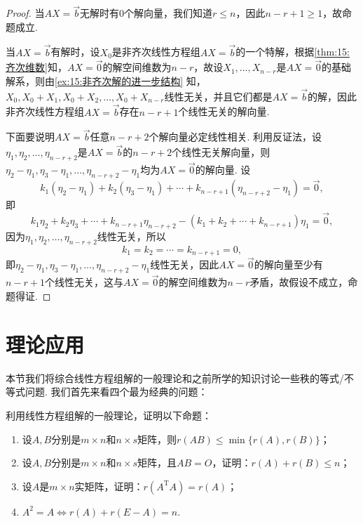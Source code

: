 \begin{proof}
    当$AX=\vec{b}$无解时有0个解向量，我们知道$r\leqslant n$，因此$n-r+1\geqslant 1$，故命题成立.

    当$AX=\vec{b}$有解时，设$X_0$是非齐次线性方程组$AX=\vec{b}$的一个特解，根据\autoref{thm:15:齐次维数}知，$AX=\vec{0}$的解空间维数为$n-r$，故设$X_1,\ldots,X_{n-r}$是$AX=\vec{0}$的基础解系，则由\autoref{ex:15:非齐次解的进一步结构} 知，$X_0,X_0+X_1,X_0+X_2,\ldots,X_0+X_{n-r}$线性无关，并且它们都是$AX=\vec{b}$的解，因此非齐次线性方程组$AX=\vec{b}$存在$n-r+1$个线性无关的解向量.

    下面要说明$AX=\vec{b}$任意$n-r+2$个解向量必定线性相关. 利用反证法，设$\eta_1,\eta_2,\ldots,\eta_{n-r+2}$是$AX=\vec{b}$的$n-r+2$个线性无关解向量，则$\eta_2-\eta_1,\eta_3-\eta_1,\ldots,\eta_{n-r+2}-\eta_1$均为$AX=\vec{0}$的解向量. 设
    \[k_1(\eta_2-\eta_1)+k_2(\eta_3-\eta_1)+\cdots+k_{n-r+1}(\eta_{n-r+2}-\eta_1)=\vec{0},\]
    即
    \[k_1\eta_2+k_2\eta_3+\cdots+k_{n-r+1}\eta_{n-r+2}-(k_1+k_2+\cdots+k_{n-r+1})\eta_1=\vec{0},\]
    因为$\eta_1,\eta_2,\ldots,\eta_{n-r+2}$线性无关，所以
    \[k_1=k_2=\cdots=k_{n-r+1}=0,\]
    即$\eta_2-\eta_1,\eta_3-\eta_1,\ldots,\eta_{n-r+2}-\eta_1$线性无关，因此$AX=\vec{0}$的解向量至少有$n-r+1$个线性无关，这与$AX=\vec{0}$的解空间维数为$n-r$矛盾，故假设不成立，命题得证.
\end{proof}

\section{理论应用}

本节我们将综合线性方程组解的一般理论和之前所学的知识讨论一些秩的等式/不等式问题. 我们首先来看四个最为经典的问题：
\begin{example}\label{ex:15:线性方程组理论与秩不等式}
    利用线性方程组解的一般理论，证明以下命题：
    \begin{enumerate}
        \item  设$A,B$分别是$m \times n$和$n \times s$矩阵，则$r(AB)\leqslant\min\{r(A),r(B)\}$；

        \item 设$A,B$分别是$m \times n$和$n \times s$矩阵，且$AB=O$，证明：$r(A)+r(B)\leqslant n$；

        \item 设$A$是$m \times n$实矩阵，证明：$r(A^\mathrm{T}A)=r(A)$；

        \item $A^2=A \iff r(A)+r(E-A)=n$.
    \end{enumerate}
\end{example}

